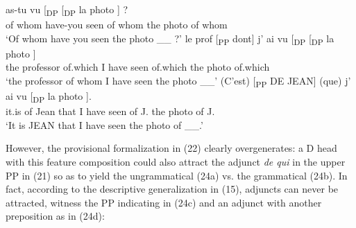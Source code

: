 \documentclass[output=paper]{langsci/langscibook}
\begin{document}
\ea%
    \label{ex:mensch:23}
    \ea
    \gll {}  as-tu  vu [\textsubscript{DP} \soutp{[\textsubscript{PP}}{2}   \soute{qui]} [\textsubscript{DP}   la  photo \soutp{[\textsubscript{PP}}{2}  \soute{qui]}] ?\\
       {}  of whom  have-you  seen  {} {}  of whom {}  the  photo   {}     of whom\\
    \glt ‘Of whom have you seen the photo \_\_ ?’
    \ex  
    \gll le  prof [\textsubscript{PP}  dont]    j’  ai  vu [\textsubscript{DP} \soutp{[\textsubscript{PP}}{2}  \soute{dont]} [\textsubscript{DP}  la   photo  \soutp{[\textsubscript{PP}}{2} \soute{dont]}] \\
         the  professor {}  of.which  I  have  seen {} {}   of.which {}  the      photo  {}  of.which\\
    \glt ‘the professor of whom I have seen the photo \_\_’
    \ex  
    \gll (C’est) [\textsubscript{PP} DE JEAN]   (que)  j’ ai  vu   [\textsubscript{DP} \soutp{[\textsubscript{PP}}{2}  \soute{Jean]}  la  photo \soutp{[\textsubscript{PP}}{2}  \soute{Jean]}].\footnotemark\\
         it.is {}  of  Jean    that  I have seen {} {}  of J.    the  photo {}     of J.\\
    \glt ‘It is JEAN that I have seen the photo of \_\_.’
    \z
\z
{}

However, the provisional formalization in (22) clearly overgenerates: a D head with this feature composition could also attract the adjunct \textit{de qui} in the upper PP in (21) so as to yield the ungrammatical (24a) vs. the grammatical (24b). In fact, according to the descriptive generalization in (15), adjuncts can never be attracted, witness the PP indicating \SOURCE in (24c) and an adjunct with another preposition as in (24d):
\end{document}
